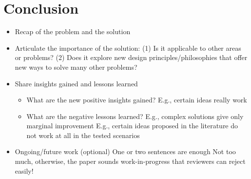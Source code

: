 \section{Conclusion}
\begin{itemize}
\item
Recap of the problem and the solution
\item
Articulate the importance of the solution:
(1) Is it applicable to other areas or problems?
(2) Does it explore new design principles/philosophies that offer new ways to solve many other problems?
\item
Share insights gained and lessons learned
\begin{itemize}
\item
What are the new positive insights gained?
E.g., certain ideas really work
\item
What are the negative lessons learned?
E.g., complex solutions give only marginal improvement
E.g., certain ideas proposed in the literature do not work at all in the tested scenarios
\end{itemize}
\item
Ongoing/future work (optional)
One or two sentences are enough
Not too much, otherwise, the paper sounds work-in-progress that reviewers can reject easily!
\end{itemize}
